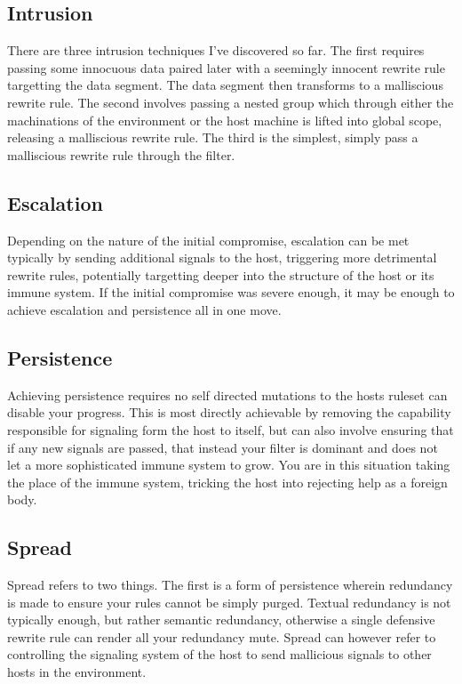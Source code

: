 \documentclass{article}
\begin{document}
	\subsection{Intrusion}
	There are three intrusion techniques I've discovered so far. The first requires passing some innocuous data paired later with a seemingly innocent rewrite rule targetting the data segment. The data segment then transforms to a malliscious rewrite rule. The second involves passing a nested group which through either the machinations of the environment or the host machine is lifted into global scope, releasing a malliscious rewrite rule. The third is the simplest, simply pass a malliscious rewrite rule through the filter.
	\subsection{Escalation}
	Depending on the nature of the initial compromise, escalation can be met typically by sending additional signals to the host, triggering more detrimental rewrite rules, potentially targetting deeper into the structure of the host or its immune system. If the initial compromise was severe enough, it may be enough to achieve escalation and persistence all in one move. 
	\subsection{Persistence}
	Achieving persistence requires no self directed mutations to the hosts ruleset can disable your progress. This is most directly achievable by removing the capability responsible for signaling form the host to itself, but can also involve ensuring that if any new signals are passed, that instead your filter is dominant and does not let a more sophisticated immune system to grow. You are in this situation taking the place of the immune system, tricking the host into rejecting help as a foreign body.
	\subsection{Spread}
	Spread refers to two things. The first is a form of persistence wherein redundancy is made to ensure your rules cannot be simply purged. Textual redundancy is not typically enough, but rather semantic redundancy, otherwise a single defensive rewrite rule can render all your redundancy mute. Spread can however refer to controlling the signaling system of the host to send mallicious signals to other hosts in the environment. 
\end{document}
